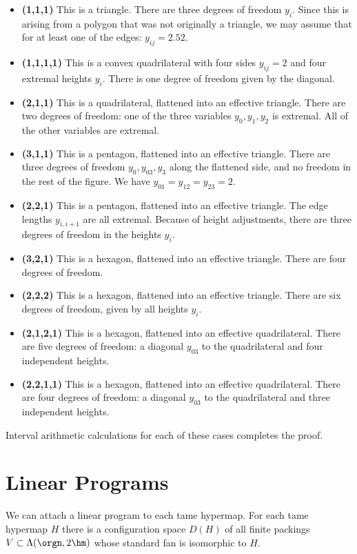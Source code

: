 \begin{itemize}
\item {\bf (1,1,1)}  This is a triangle.  There are three degrees of
freedom $y_i$.  Since this is arising from a polygon that was not originally a triangle, we may assume that for at least one of the edges: $y_{ij}=2.52$.
\item {\bf (1,1,1,1)}  This is a convex quadrilateral with four sides $y_{ij}=2$ and four extremal heights $y_i$.  There is one degree of freedom given by the diagonal.
\item {\bf (2,1,1)} This is a quadrilateral, flattened into an effective triangle.  There are two degrees of freedom: one of the three variables $y_0,y_1,y_2$ is extremal.  All of the other variables are extremal.
\item {\bf (3,1,1)}  This is a pentagon, flattened into an effective triangle.  There are three degrees of freedom $y_0,y_{03},y_3$ along the flattened side, and no freedom in the rest of the figure.  We have $y_{01}=y_{12}=y_{23}=2$.
\item {\bf (2,2,1)} This is a pentagon, flattened into an effective triangle.  The edge lengths $y_{i,i+1}$ are all extremal.  Because of height adjustments, there are three degrees of freedom in the heights $y_i$.
\item {\bf (3,2,1)} This is a hexagon, flattened into an effective triangle.  There are four degrees of freedom.
\item {\bf (2,2,2)}  This is a hexagon, flattened into an effective triangle.  There are six degrees of freedom, given by all heights $y_i$.
\item {\bf (2,1,2,1)} This is a hexagon, flattened into an effective quadrilateral.  There are five degrees of freedom: a diagonal $y_{03}$ to the quadrilateral and four independent heights.
\item {\bf (2,2,1,1)}  This is a hexagon, flattened into an effective quadrilateral.  There are four degrees of freedom: a diagonal $y_{03}$ to the quadrilateral and three independent heights.
\end{itemize}


Interval arithmetic calculations for each of these cases completes the proof.


\section{Linear Programs}

We can attach a linear program to each tame hypermap.
For each tame hypermap $H$ there is a configuration space $D(H)$ of all
finite packings $V\subset \Lambda(\orgn,2\hm)$ whose standard fan is
isomorphic to $H$.

